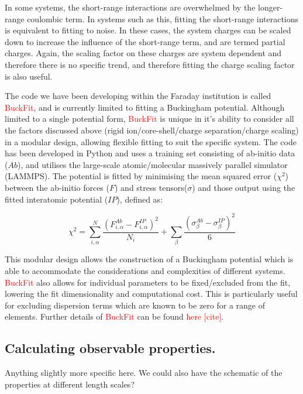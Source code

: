 \documentclass[journal=jacsat,manuscript=article]{achemso}
\newcommand{\re}[1]{\textcolor{red}{#1}}
\begin{document}
In some systems, the short-range interactions are overwhelmed by the longer-range coulombic term. In systems such as this, fitting the short-range interactions is equivalent to fitting to noise. In these cases, the system charges can be scaled down to increase the influence of the short-range term, and are termed partial charges. Again, the scaling factor on these charges are system dependent and therefore there is no specific trend, and therefore fitting the charge scaling factor is also useful.

The code we have been developing within the Faraday institution is called \re{BuckFit}, and is currently limited to fitting a Buckingham potential. Although limited to a single potential form, \re{BuckFit} is unique in it's ability to consider all the factors discussed above (rigid ion/core-shell/charge separation/charge scaling) in a modular design, allowing flexible fitting to suit the specific system. The code has been developed in Python and uses a training set consisting of ab-initio data ($Ab$), and utilises the large-scale atomic/molecular massively parallel simulator (LAMMPS). \cite{PLIMPTON19951} The potential is fitted by minimising the mean squared error ($\chi^2$) between the ab-initio forces ($F$) and stress tensors($\sigma$) and those output using the fitted interatomic potential ($IP$), defined as:

\begin{equation}
    \chi^2 = \sum^{N}_{i,\alpha} \frac{(F^{Ab}_{i,\alpha} - F^{IP}_{i,\alpha})^2}{N_i} +  \sum_{\beta} \frac{(\sigma^{Ab}_{\beta} - \sigma^{IP}_{\beta})^2}{6}
\end{equation}

This modular design allows the construction of a Buckingham potential which is able to accommodate the considerations and complexities of different systems. \re{BuckFit} also allows for individual parameters to be fixed/excluded from the fit, lowering the fit dimensionality and computational cost. This is particularly useful for excluding dispersion terms which are known to be zero for a range of elements. Further details of \re{BuckFit} can be found \re{here [cite]}.

\subsection{Calculating observable properties.}
Anything slightly more specific here. We could also have the schematic of the properties at different length scales?
\end{document}
